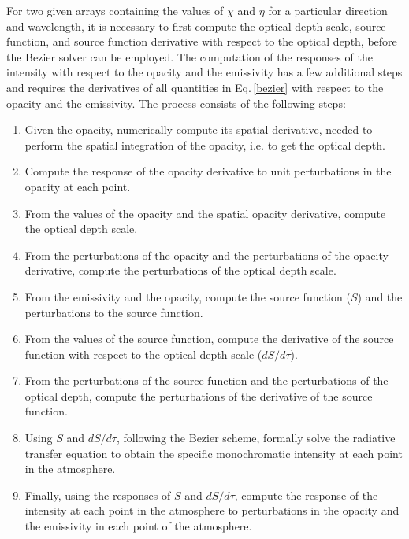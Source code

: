 \documentclass{aa}
\begin{document}
For two given arrays containing the values of $\chi$ and $\eta$ for a particular direction and wavelength, it is necessary to first compute the optical depth scale, source function, and source function derivative with respect to the optical depth, before the Bezier solver can be employed. The computation of the responses of the intensity with respect to the opacity and the emissivity has a few additional steps and requires the derivatives of all quantities in Eq.\,\ref{bezier} with respect to the opacity and the emissivity. The process consists of the following steps:
\begin{enumerate}
 \item Given the opacity, numerically compute its spatial derivative, needed to perform the spatial integration of the opacity, i.e. to get the optical depth.
 \item Compute the response of the opacity derivative to unit perturbations in the opacity at each point.
 \item From the values of the opacity and the spatial opacity derivative, compute the optical depth scale. 
 \item From the perturbations of the opacity and the perturbations of the opacity derivative, compute the perturbations of the optical depth scale. 
 \item From the emissivity and the opacity, compute the source function ($S$) and the perturbations to the source function.
 \item From the values of the source function, compute the derivative of the source function with respect to the optical depth scale ($dS/d\tau$).
 \item From the perturbations of the source function and the perturbations of the optical depth, compute the perturbations of the derivative of the source function.
 \item Using $S$ and $dS/d\tau$, following the Bezier scheme, formally solve the radiative transfer equation to obtain the specific monochromatic intensity at each point in the atmosphere.
 \item Finally, using the responses of $S$ and $dS/d\tau$, compute the response of the intensity at each point in the atmosphere to perturbations in the opacity and the emissivity in each point of the atmosphere. 
\end{enumerate}
\end{document}
